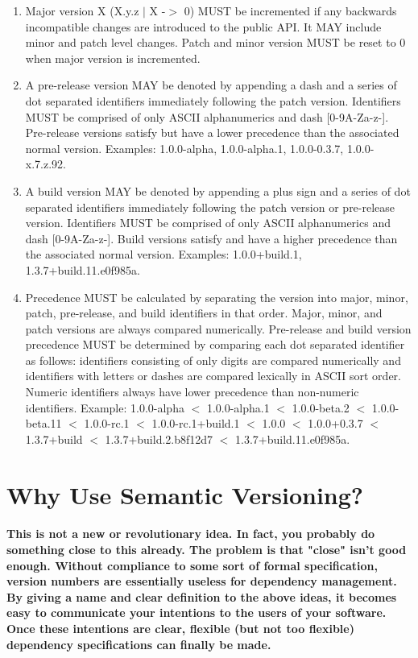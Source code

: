 \begin{enumerate}
  \item
    Major version X (X.y.z $|$ X -$>$ 0) MUST be incremented if 
    any backwards incompatible changes are introduced to the public API. 
    It MAY include minor and patch level changes. Patch and minor version 
    MUST be reset to 0 when major version is incremented.
  \item
    A pre-release version MAY be denoted by appending a dash and a series of 
    dot separated identifiers immediately following the patch version. Identifiers 
    MUST be comprised of only ASCII alphanumerics and dash [0-9A-Za-z-]. Pre-release 
    versions satisfy but have a lower precedence than the associated normal version. 
    Examples: 1.0.0-alpha, 1.0.0-alpha.1, 1.0.0-0.3.7, 1.0.0-x.7.z.92.
  \item
    A build version MAY be denoted by appending a plus sign and a series of dot 
    separated identifiers immediately following the patch version or pre-release 
    version. Identifiers MUST be comprised of only ASCII alphanumerics and dash 
    [0-9A-Za-z-]. Build versions satisfy and have a higher precedence than the 
    associated normal version. Examples: 1.0.0+build.1, 1.3.7+build.11.e0f985a.
  \item
    Precedence MUST be calculated by separating the version into major, minor, 
    patch, pre-release, and build identifiers in that order. Major, minor, and 
    patch versions are always compared numerically. Pre-release and build version 
    precedence MUST be determined by comparing each dot separated identifier as 
    follows: identifiers consisting of only digits are compared numerically and 
    identifiers with letters or dashes are compared lexically in ASCII sort order. 
    Numeric identifiers always have lower precedence than non-numeric identifiers. 
    Example: 1.0.0-alpha $<$ 1.0.0-alpha.1 $<$ 1.0.0-beta.2 $<$ 1.0.0-beta.11 
    $<$ 1.0.0-rc.1 $<$ 1.0.0-rc.1+build.1 $<$ 1.0.0 $<$ 1.0.0+0.3.7 
    $<$ 1.3.7+build $<$ 1.3.7+build.2.b8f12d7 $<$ 1.3.7+build.11.e0f985a.
\end{enumerate}

\section{Why Use Semantic Versioning?}

\paragraph{
This is not a new or revolutionary idea. In fact, you probably do something close 
to this already. The problem is that "close" isn't good enough. Without compliance 
to some sort of formal specification, version numbers are essentially useless for 
dependency management. By giving a name and clear definition to the above ideas, 
it becomes easy to communicate your intentions to the users of your software. Once 
these intentions are clear, flexible (but not too flexible) dependency specifications 
can finally be made.
}

